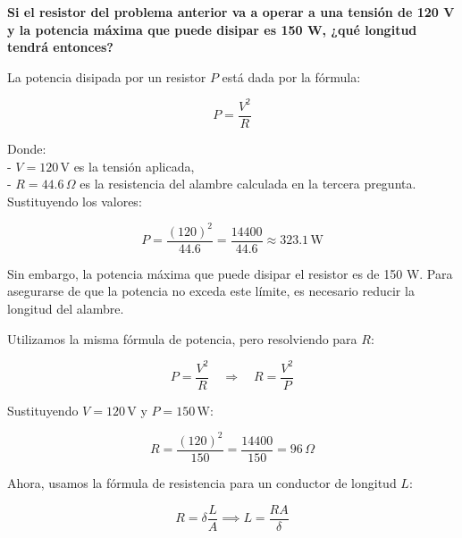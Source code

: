 \documentclass[answers]{exam} %
\begin{document}
\begin{questions}

	\vspace{0.5cm}
	
	\question \textbf{Si el resistor del problema anterior va a operar a una tensión de 120 V y la potencia máxima que puede disipar es 150 W, ¿qué longitud tendrá entonces?}


	La potencia disipada por un resistor \(P\) está dada por la fórmula:

	\[
		\boxed{P = \frac{V^2}{R}}
	\]

	Donde:\\
	- \(V = 120 \, \text{V}\) es la tensión aplicada,\\
	- \(R = 44.6 \, \Omega\) es la resistencia del alambre calculada en la tercera pregunta.\\

	Sustituyendo los valores:

	\[
		P = \frac{(120)^2}{44.6} = \frac{14400}{44.6} \approx 323.1 \, \text{W}
	\]

	Sin embargo, la potencia máxima que puede disipar el resistor es de 150 W. Para asegurarse de que la potencia no exceda este límite, es necesario reducir la longitud del alambre.

	Utilizamos la misma fórmula de potencia, pero resolviendo para \(R\):

	\[
		P = \frac{V^2}{R} \quad \Rightarrow \quad R = \frac{V^2}{P}
	\]

	Sustituyendo \(V = 120 \, \text{V}\) y \(P = 150 \, \text{W}\):

	\[
		R = \frac{(120)^2}{150} = \frac{14400}{150} = 96 \, \Omega
	\]

	Ahora, usamos la fórmula de resistencia para un conductor de longitud \(L\):

	\[
		R = \delta \frac{L}{A} \implies L = \frac{R A}{\delta}
	\]


\end{questions}
\end{document}

